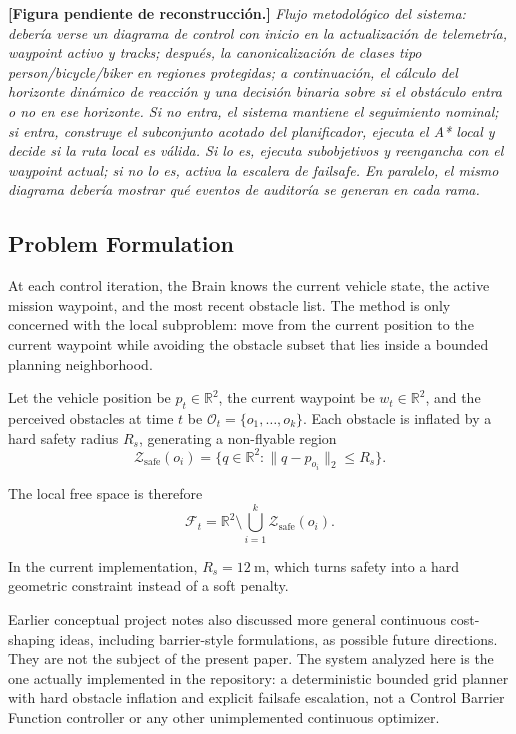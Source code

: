 \documentclass[a4paper,11pt]{article}
\newcommand{\diagramplaceholder}[1]{\par\smallskip\noindent\textbf{[Figura pendiente de reconstrucción.] } \emph{#1}\par\smallskip}
\begin{document}
\diagramplaceholder{Flujo metodológico del sistema: debería verse un diagrama de control con inicio en la actualización de telemetría, waypoint activo y tracks; después, la canonicalización de clases tipo person/bicycle/biker en regiones protegidas; a continuación, el cálculo del horizonte dinámico de reacción y una decisión binaria sobre si el obstáculo entra o no en ese horizonte. Si no entra, el sistema mantiene el seguimiento nominal; si entra, construye el subconjunto acotado del planificador, ejecuta el A* local y decide si la ruta local es válida. Si lo es, ejecuta subobjetivos y reengancha con el waypoint actual; si no lo es, activa la escalera de failsafe. En paralelo, el mismo diagrama debería mostrar qué eventos de auditoría se generan en cada rama.}

\subsection{Problem Formulation}

At each control iteration, the Brain knows the current vehicle state, the active mission waypoint, and the most recent obstacle list. The method is only concerned with the local subproblem: move from the current position to the current waypoint while avoiding the obstacle subset that lies inside a bounded planning neighborhood.

Let the vehicle position be \(p_t \in \mathbb{R}^2\), the current waypoint be \(w_t \in \mathbb{R}^2\), and the perceived obstacles at time \(t\) be \(\mathcal{O}_t = \{o_1,\dots,o_k\}\). Each obstacle is inflated by a hard safety radius \(R_s\), generating a non-flyable region
\begin{equation}
    \mathcal{Z}_{\mathrm{safe}}(o_i) = \{q \in \mathbb{R}^2 : \lVert q - p_{o_i} \rVert_2 \le R_s\}.
\end{equation}

The local free space is therefore
\begin{equation}
    \mathcal{F}_t = \mathbb{R}^2 \setminus \bigcup_{i=1}^{k} \mathcal{Z}_{\mathrm{safe}}(o_i).
\end{equation}

In the current implementation, \(R_s = \SI{12}{\meter}\), which turns safety into a hard geometric constraint instead of a soft penalty.

Earlier conceptual project notes also discussed more general continuous cost-shaping ideas, including barrier-style formulations, as possible future directions. They are not the subject of the present paper. The system analyzed here is the one actually implemented in the repository: a deterministic bounded grid planner with hard obstacle inflation and explicit failsafe escalation, not a Control Barrier Function controller or any other unimplemented continuous optimizer.
\end{document}
